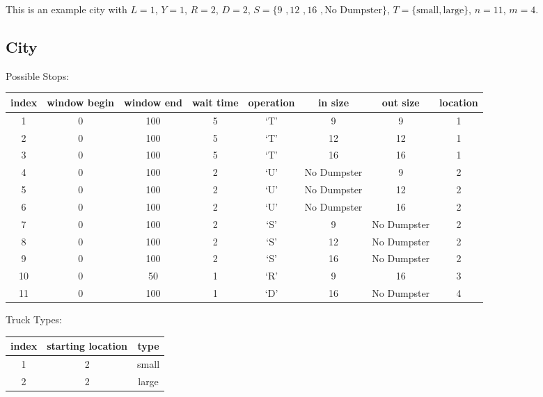 \documentclass{article}
\begin{document}
This is an example city with $L = 1$, $Y = 1$, $R = 2$, $D = 2$, $S = \{ \mbox{9  }, \mbox{12   }, \mbox{16   }, \mbox{No Dumpster} \}$,
$T = \{ \mbox {small}, \mbox{large}  \}$, $n=11$, $m=4$.

\subsection{City}
Possible Stops:

\begin{tabular} {c | c c c c c c c }
 index  & window begin & window end & wait time & operation & in size      & out size       & location  \\
\hline
   1    &    0         & 100        & 5         & `T'       & 9            & 9              &    1      \\
   2    &    0         & 100        & 5         & `T'       & 12           & 12             &    1      \\
   3    &    0         & 100        & 5         & `T'       & 16           & 16             &    1      \\
   4    &    0         & 100        & 2         & `U'       & No Dumpster  & 9              &    2      \\
   5    &    0         & 100        & 2         & `U'       & No Dumpster  & 12             &    2      \\
   6    &    0         & 100        & 2         & `U'       & No Dumpster  & 16             &    2      \\
   7    &    0         & 100        & 2         & `S'       & 9            & No Dumpster    &    2      \\
   8    &    0         & 100        & 2         & `S'       & 12           & No Dumpster    &    2      \\
   9    &    0         & 100        & 2         & `S'       & 16           & No Dumpster    &    2      \\
  10    &    0         & 50         & 1         & `R'       & 9            &        16      &    3      \\
  11    &    0         & 100        & 1         & `D'       & 16           & No Dumpster    &    4      \\
\end{tabular}


Truck Types:

\begin{tabular} {c | c c}
index & starting location   & type  \\
\hline
  1   &  2                  & small \\
  2   &  2                  & large \\
\end{tabular}
\end{document}
